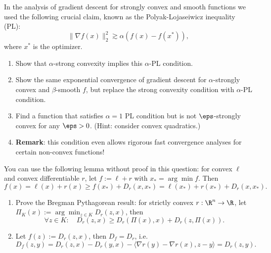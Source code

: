 \documentclass[addpoints,12pt,A4]{exam}
\begin{document}
\begin{questions}
 \question
 In the analysis of gradient descent for strongly convex and smooth functions we used the following crucial claim, known as the Polyak-Lojaseiwicz inequality (PL):
 \[ \|\nabla f(x)\|_{2}^{2} \gtrsim \alpha (f(x) - f(x^{*})) ,    \]
 where $x^{*}$ is the optimizer. 
     \begin{enumerate}
     \item  Show that $\alpha$-strong convexity implies this $\alpha$-PL condition. 
     \item Show the same exponential convergence of gradient descent for $\alpha$-strongly convex and $\beta$-smooth $f$, but replace the strong convexity condition with $\alpha$-PL condition.  
     \item Find a function that satisfies $\alpha=1$ PL condition but is not $\eps$-strongly convex for any $\eps > 0$. (Hint: consider convex quadratics.) 
     \item \textbf{Remark}: this condition even allows rigorous fast convergence analyses for certain non-convex functions!
 \end{enumerate}
 \begin{solution}
 \end{solution}

 

\question
You can use the following lemma without proof in this question: for convex $\ell$ and convex differentiable $r$, let $f := \ell + r$ with $x_{*} = \arg\min f$. Then 
\[ f(x) = \ell(x) + r(x) \geq f(x_{*}) + D_{r}(x,x_{*}) = \ell(x_{*}) + r(x_{*}) + D_{r}(x,x_{*}) .    \]
\begin{enumerate}
\item Prove the Bregman Pythagorean result: for strictly convex $r : \R^{n} \to \R$, let $\Pi_{K}(x) := \arg\min_{z \in K} D_{r}(z,x)$, then 
\[ \forall z \in K: \quad D_{r}(z, x) \geq D_{r}(\Pi(x), x) + D_{r}(z, \Pi(x)) .    \]
\item Let $f(z) := D_{r}(z,x)$, then $D_{f} = D_{r}$, i.e. 
\[ D_{f}(z,y) = D_{r}(z,x) - D_{r}(y,x) - \langle \nabla r(y) - \nabla r(x), z - y \rangle = D_{r}(z,y) .   \]
\end{enumerate} 

\begin{solution}
\end{solution}





\end{questions}
\end{document}
